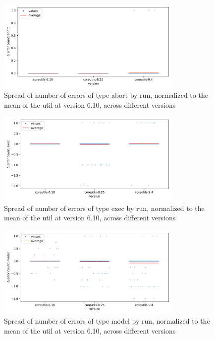\documentclass{article}
\begin{document}
\begin{figure}[htbp]
    \centering
    \includegraphics[width=0.8\textwidth]{../plots/num_errors (abort)/changes-by-version.png}
    \captionsetup{width=0.6\textwidth}
    \caption{Spread of number of errors of type abort by run, normalized to the mean of the util at version 6.10, across different versions}
\end{figure}
\begin{figure}[htbp]
    \centering
    \includegraphics[width=0.8\textwidth]{../plots/num_errors (exec)/changes-by-version.png}
    \captionsetup{width=0.6\textwidth}
    \caption{Spread of number of errors of type exec by run, normalized to the mean of the util at version 6.10, across different versions}
\end{figure}
\begin{figure}[htbp]
    \centering
    \includegraphics[width=0.8\textwidth]{../plots/num_errors (model)/changes-by-version.png}
    \captionsetup{width=0.6\textwidth}
    \caption{Spread of number of errors of type model by run, normalized to the mean of the util at version 6.10, across different versions}
\end{figure}
\end{document}
